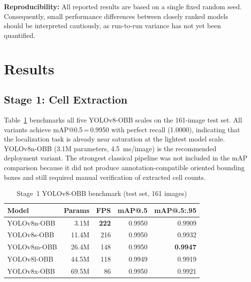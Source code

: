 \documentclass[conference]{IEEEtran}
\begin{document}
\textbf{Reproducibility:} All reported results are based on a single fixed random seed. Consequently, small performance differences between closely ranked models should be interpreted cautiously, as run-to-run variance has not yet been quantified.

\section{Results}
\label{sec:results}

\subsection{Stage 1: Cell Extraction}

Table~\ref{tab:stage1_results} benchmarks all five YOLOv8-OBB scales on the 161-image test set. All variants achieve mAP@0.5\,=\,0.9950 with perfect recall (1.0000), indicating that the localization task is already near saturation at the lightest model scale. YOLOv8n-OBB (3.1M parameters, 4.5~ms/image) is the recommended deployment variant. The strongest classical pipeline was not included in the mAP comparison because it did not produce annotation-compatible oriented bounding boxes and still required manual verification of extracted cell counts.

\begin{table}[t]
  \caption{Stage~1 YOLOv8-OBB benchmark (test set, 161 images)}
  \label{tab:stage1_results}
  \begin{center}
  \renewcommand{\arraystretch}{0.95}\small
  \begin{tabular}{lrrrr}
    \toprule
    \textbf{Model} & \textbf{Params} & \textbf{FPS} & \textbf{mAP@.5} & \textbf{mAP@.5:.95}\\
    \midrule
    YOLOv8n-OBB & 3.1M  & \textbf{222} & 0.9950 & 0.9909\\
    YOLOv8s-OBB & 11.4M & 216          & 0.9950 & 0.9932\\
    YOLOv8m-OBB & 26.4M & 148          & 0.9950 & \textbf{0.9947}\\
    YOLOv8l-OBB & 44.5M & 118          & 0.9949 & 0.9919\\
    YOLOv8x-OBB & 69.5M & 86           & 0.9950 & 0.9921\\
    \midrule
  \end{tabular}
  \end{center}
\end{table}
\end{document}
